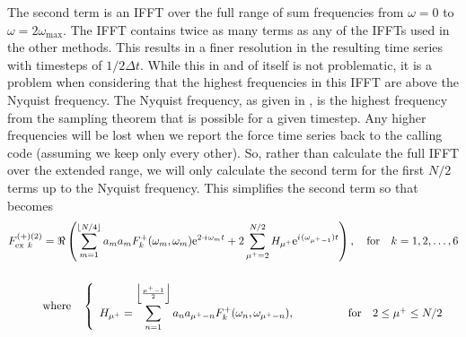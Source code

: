The second term is an IFFT over the full range of sum frequencies from $\omega = 0$ to $\omega = 2 \omega_\text{max}$.  The IFFT contains twice as many terms as any of the IFFTs used in the other methods.  This results in a finer resolution in the resulting time series with timesteps of $1/2 \Delta t$.  While this in and of itself is not problematic, it is a problem when considering that the highest frequencies in this IFFT are above the Nyquist frequency.  The Nyquist frequency, as given in , is the highest frequency from the sampling theorem that is possible for a given timestep.  Any higher frequencies will be lost when we report the force time series back to the calling code (assuming we keep only every other).  So, rather than calculate the full IFFT over the extended range, we will only calculate the second term for the first $N/2$ terms up to the Nyquist frequency.  This simplifies the second term so that  becomes
\begin{align}
   {F_{\text{ex}~k}^{(+)(2)}} &= \Re 
      \left(
         \sum\limits_{m=1}^{\lfloor N/4 \rfloor}   a_m a_m F_k^{+}(\omega_m,\omega_m) \mathrm{e}^{2\cdot{i\mkern1.5mu}\omega_m t} +
         2 \sum\limits_{\mu^{+}=2}^{N/2} H_{\mu^{+}}\mathrm{e}^{{i\mkern1.5mu}(\omega_{\mu^{+}-1})t}
      \right)  ,\quad\text{for}\quad k=1,2,\ldots,6 \label{eq:SumQTFsimple}\\[1.5em]
   &\text{where}\quad\left\{
   \begin{array}{lr}
      H_{\mu^{+}} = \displaystyle\sum\limits_{n=1}^{\left\lfloor\frac{\mu^{+}-1}{2}\right\rfloor}
               a_n a_{\mu^{+}-n} F_k^{+}(\omega_n,\omega_{\mu^{+}-n}),
         \qquad\qquad&\text{for}\quad 2\le \mu^{+}\le N/2
   \end{array}\right.
\end{align}








\endinput
